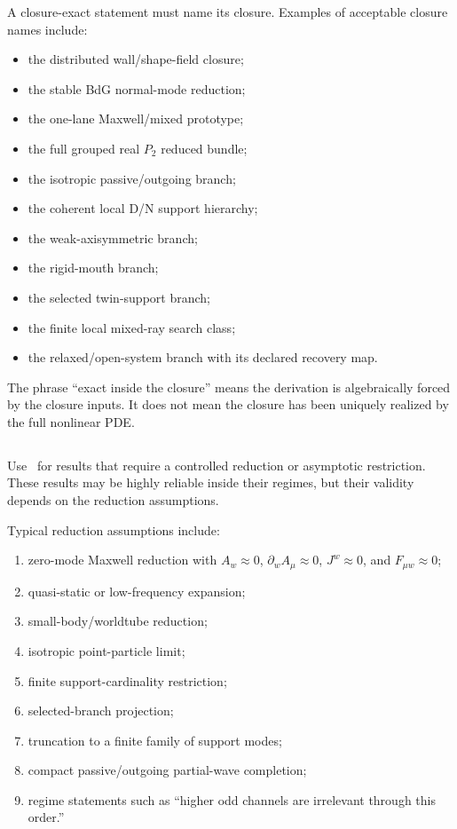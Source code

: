 A closure-exact statement must name its closure.  Examples of acceptable closure names include:
\begin{itemize}[leftmargin=2.2em]
  \item the distributed wall/shape-field closure;
  \item the stable BdG normal-mode reduction;
  \item the one-lane Maxwell/mixed prototype;
  \item the full grouped real \(P_2\) reduced bundle;
  \item the isotropic passive/outgoing branch;
  \item the coherent local D/N support hierarchy;
  \item the weak-axisymmetric branch;
  \item the rigid-mouth branch;
  \item the selected twin-support branch;
  \item the finite local mixed-ray search class;
  \item the relaxed/open-system branch with its declared recovery map.
\end{itemize}

The phrase ``exact inside the closure'' means the derivation is algebraically forced by the closure inputs.  It does not mean the closure has been uniquely realized by the full nonlinear PDE.

\subsection{\StatusReduced}
\label{subsec:status-reduced}

Use \StatusReduced\ for results that require a controlled reduction or asymptotic restriction.  These results may be highly reliable inside their regimes, but their validity depends on the reduction assumptions.

Typical reduction assumptions include:
\begin{enumerate}[leftmargin=2.2em]
  \item zero-mode Maxwell reduction with \(A_w\approx0\), \(\partial_wA_\mu\approx0\), \(J^w\approx0\), and \(F_{\mu w}\approx0\);
  \item quasi-static or low-frequency expansion;
  \item small-body/worldtube reduction;
  \item isotropic point-particle limit;
  \item finite support-cardinality restriction;
  \item selected-branch projection;
  \item truncation to a finite family of support modes;
  \item compact passive/outgoing partial-wave completion;
  \item regime statements such as ``higher odd channels are irrelevant through this order.''
\end{enumerate}

